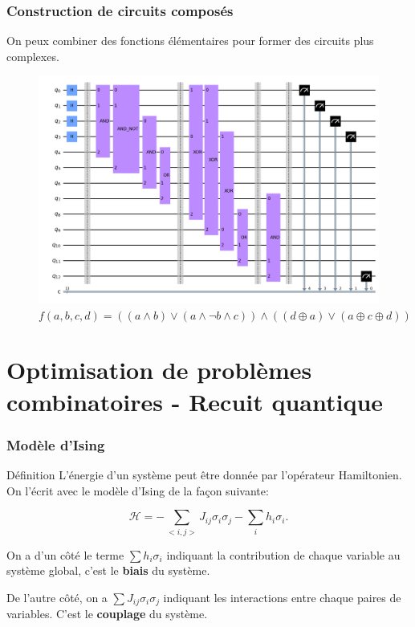 \documentclass{beamer}
\begin{document}
\begin{frame}
    \frametitle{Construction de circuits composés}
    On peux combiner des fonctions élémentaires pour former des circuits plus complexes.

    \begin{figure}[H]
        \centering
        \centerline{
            \includegraphics[scale=0.25]{circuit.png}
        }
        \caption{$f(a, b, c, d) = ((a \land b) \lor (a \land \neg b \land c)) \land ((d \oplus a) \lor (a \oplus c \oplus d))$}
        \label{fig:circ_ex_1_1_1}
    \end{figure}
\end{frame}

\section[Problèmes combinatoires]{Optimisation de problèmes combinatoires - Recuit quantique}

\begin{frame}
    \frametitle{Modèle d'Ising}

    \begin{block}{Définition}
        L'énergie d'un système peut être donnée par l'opérateur Hamiltonien. On l'écrit avec le modèle d'Ising de la façon suivante:

        \begin{equation}
            \mathcal{H} = -\displaystyle\sum_{<i, j>} J_{ij} \sigma_i \sigma_j - \displaystyle\sum_{i} h_i \sigma_i .
        \end{equation}

        On a d'un côté le terme $\displaystyle\sum h_i \sigma_i$ indiquant la contribution de chaque variable au système global, c'est le \textbf{biais} du système.

        \hspace{10cm}

        De l'autre côté, on a $\displaystyle\sum J_{ij} \sigma_i \sigma_j$ indiquant les interactions entre chaque paires de variables. C'est le \textbf{couplage} du système.
    \end{block}
\end{frame}
\end{document}
